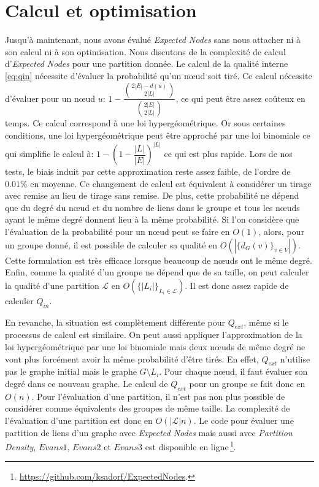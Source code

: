\section{Calcul et optimisation}
Jusqu'à maintenant, nous avons évalué \emph{Expected Nodes} sans nous attacher ni à son calcul ni à son optimisation.
Nous discutons de la complexité de calcul d'\emph{Expected Nodes} pour une partition donnée.
Le calcul de la qualité interne \ref{eq:qin} nécessite d'évaluer la probabilité qu'un n\oe{}ud soit tiré.
Ce calcul nécessite d'évaluer pour un n\oe{}ud $u$: $1 - \dfrac{ \binom{2|E|-d(u)}{2|L|} }{ \binom{2|E|}{2|L|} }$, ce qui peut être assez coûteux en temps.
Ce calcul correspond à une loi hypergéométrique.
Or sous certaines conditions, une loi hypergéométrique peut être approché par une loi binomiale ce qui simplifie le calcul à: $1 - (1- \dfrac{|L|}{|E|})^{|L|}$ ce qui est plus rapide.
Lors de nos tests, le biais induit par cette approximation reste assez faible, de l'ordre de $0.01\%$ en moyenne.
Ce changement de calcul est équivalent à considérer un tirage avec remise au lieu de tirage sans remise.
De plus, cette probabilité ne dépend que du degré du n\oe{}ud et du nombre de liens dans le groupe et tous les n\oe{}uds ayant le même degré donnent lieu à la même probabilité.
Si l'on considère que l'évaluation de la probabilité pour un n\oe{}ud peut se faire en $O(1)$, alors, pour un groupe donné, il est possible de calculer sa qualité en $O(|\{d_G(v)\}_{v \in V}|)$.
Cette formulation est très efficace lorsque beaucoup de n\oe{}uds ont le même degré.
Enfin, comme la qualité d'un groupe ne dépend que de sa taille, on peut calculer la qualité d'une partition $\mathcal{L}$ en $O(\{|L_i|\}_{L_i \in \mathcal{L}})$.
Il est donc assez rapide de calculer $Q_{in}$.



En revanche, la situation est complètement différente pour $Q_{ext}$, même si le processus de calcul est similaire.
On peut aussi appliquer l'approximation de la loi hypergéométrique par une loi binomiale mais deux n\oe{}uds de même degré ne vont plus forcément avoir la même probabilité d'être tirés.
En effet, $Q_{ext}$ n'utilise pas le graphe initial mais le graphe $G\setminus L_i$.
Pour chaque n\oe{}ud, il faut évaluer son degré dans ce nouveau graphe.
Le calcul de $Q_{ext}$ pour un groupe se fait donc en $O(n)$.
Pour l'évaluation d'une partition, il n'est pas non plus possible de considérer comme équivalents des groupes de même taille.
La complexité de l'évaluation d'une partition est donc en $O(|\mathcal{L}|n)$.
Le code pour évaluer une partition de liens d'un graphe avec \emph{Expected Nodes} mais aussi avec \emph{Partition Density}, $Evans1$, $Evans2$ et $Evans3$ est disponible en ligne\,\footnote{ \url{https://github.com/ksadorf/ExpectedNodes}.}.


